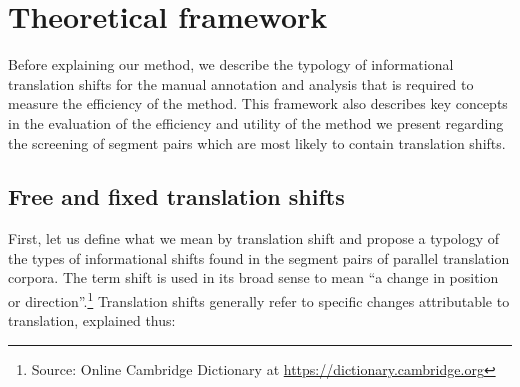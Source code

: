 \documentclass[output=paper]{langsci/langscibook}
\begin{document}
\section{Theoretical framework}\label{ep:th}

Before explaining our method, we describe the typology of informational translation shifts for the manual annotation and analysis that is required to measure the efficiency of the method. This framework also describes key concepts in the evaluation of the efficiency and utility of the method we present regarding the screening of segment pairs which are most likely to contain translation shifts.

\subsection{Free and fixed translation shifts}\label{ep:frfr}

First, let us define what we mean by translation shift and propose a typology of the types of informational shifts found in the segment pairs of parallel translation corpora. The term shift is used in its broad sense to mean \enquote{a change in position or direction}.\footnote{Source: Online Cambridge Dictionary at \url{https://dictionary.cambridge.org}} Translation shifts generally refer to specific changes attributable to translation, explained thus: 
\end{document}
